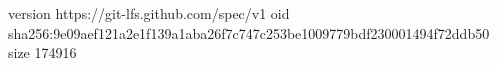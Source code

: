 version https://git-lfs.github.com/spec/v1
oid sha256:9e09aef121a2e1f139a1aba26f7c747c253be1009779bdf230001494f72ddb50
size 174916
